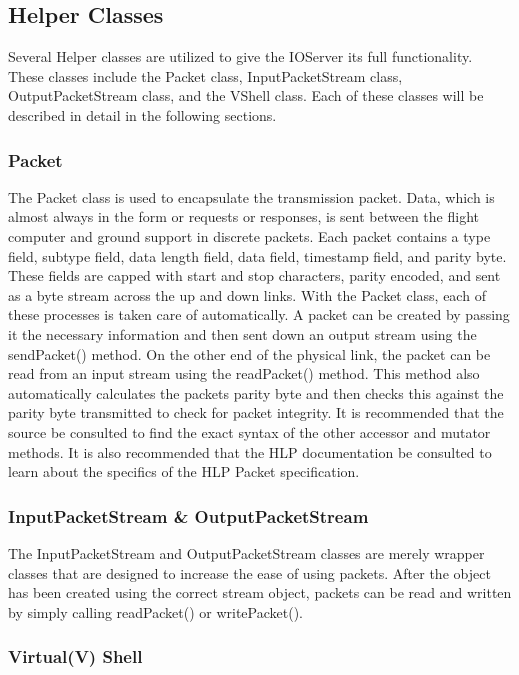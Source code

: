 \subsection{Helper Classes}

Several Helper classes are utilized to give the IOServer its full functionality. These classes include the
Packet class, InputPacketStream class, OutputPacketStream class, and the VShell class. Each of these classes
will be described in detail in the following sections.

\subsubsection{Packet}

The Packet class is used to encapsulate the transmission packet. Data, which is almost always in the form or 
requests or responses, is sent between the flight computer and ground support in discrete packets. Each packet 
contains a type field, subtype field, data length field, data field, timestamp field, and parity byte. These 
fields are capped
with start and stop characters, parity encoded, and sent as a byte stream across the up and down links. With the
Packet class, each of these processes is taken care of automatically. A packet can be created by passing it the
necessary information and then sent down an output stream using the sendPacket() method. On the other end of
the physical link, the packet can be read from an input stream using the readPacket() method. This method also
automatically calculates the packets parity byte and then checks this against the parity byte transmitted to 
check for packet integrity. It is recommended that the source be consulted to find the exact syntax of the
other accessor and mutator methods. It is also recommended that the HLP documentation be consulted to learn
about the specifics of the HLP Packet specification.

\subsubsection{InputPacketStream \& OutputPacketStream}

The InputPacketStream and OutputPacketStream classes are merely wrapper classes that are designed to 
increase the ease of using packets. After the object has been created using the correct stream
object, packets can be read and written by simply calling readPacket() or writePacket().

\subsubsection{\bf V\rm irtual(V) Shell}


